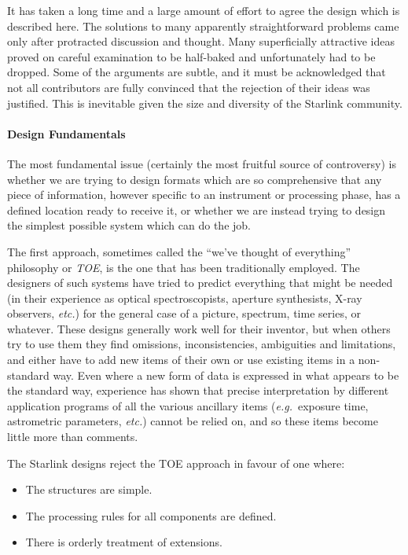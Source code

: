 It has taken a long time and a large amount of effort
to agree the design which is described here.
The solutions to many apparently
straightforward problems came only after
protracted discussion and
thought.  Many superficially attractive ideas proved on careful
examination to be half-baked and unfortunately had to be dropped.
Some of the arguments are subtle, and it must be acknowledged that
not all contributors are fully convinced that the rejection
of their ideas was justified.  This is inevitable given the
size and diversity of the Starlink community.

\paragraph{Design Fundamentals}
The most fundamental issue (certainly the
most fruitful source of controversy) is whether we are
trying to design formats which are so comprehensive that
any piece of information, however specific to an instrument or
processing phase, has a defined location ready to receive
it, or whether we are instead trying to design
the simplest possible system which can do the job.

The first approach, sometimes called the ``we've thought of
everything'' philosophy or {\it TOE}, is the one that has been
traditionally employed.  The designers of such systems
have tried to predict everything that might be needed (in their
experience as optical spectroscopists, aperture synthesists,
X-ray observers, {\it etc.}) for the general case of a picture,
spectrum, time series, or whatever.  These designs generally
work well for their inventor, but when others try to use them
they find omissions, inconsistencies, ambiguities and
limitations, and either have to add new items of their
own or use existing items in a non-standard way.  Even where
a new form of data is expressed in what appears to be the
standard way, experience has shown that precise interpretation
by different application programs
of all the various ancillary items ({\it e.g.}\ exposure time,
astrometric parameters, {\it etc.}) cannot be relied on, and so
these items become little more than comments.

The Starlink designs reject the TOE
approach in favour of one where:
\begin{itemize}
\item The structures are simple.
\item The processing rules for all components are defined.
\item There is orderly treatment of extensions.
\end{itemize}

